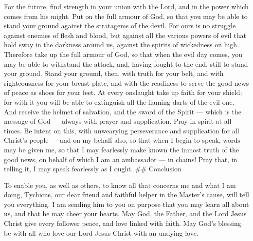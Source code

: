  For the future, find strength in your union with the Lord,
and in the power which comes from his might.  Put on the
full armour of God, so that you may be able to stand your ground against
the stratagems of the devil.  For ours is no struggle
against enemies of flesh and blood, but against all the various powers
of evil that hold sway in the darkness around us, against the spirits of
wickedness on high.  Therefore take up the full armour of
God, so that when the evil day comes, you may be able to withstand the
attack, and, having fought to the end, still to stand your ground.
 Stand your ground, then, with truth for your belt, and
with righteousness for your breast-plate,  and with the
readiness to serve the good news of peace as shoes for your feet.
 At every onslaught take up faith for your shield; for with
it you will be able to extinguish all the flaming darts of the evil one.
 And receive the helmet of salvation, and the sword of the
Spirit --- which is the message of God --- always with prayer and
supplication.  Pray in spirit at all times. Be intent on
this, with unwearying perseverance and supplication for all Christ's
people ---  and on my behalf also, so that when I begin to
speak, words may be given me, so that I may fearlessly make known the
inmost truth of the good news,  on behalf of which I am an
ambassador --- in chains! Pray that, in telling it, I may speak
fearlessly as I ought. \#\# Conclusion

 To enable you, as well as others, to know all that
concerns me and what I am doing, Tychicus, our dear friend and faithful
helper in the Master's cause, will tell you everything.  I
am sending him to you on purpose that you may learn all about us, and
that he may cheer your hearts.  May God, the Father, and
the Lord Jesus Christ give every follower peace, and love linked with
faith.  May God's blessing be with all who love our Lord
Jesus Christ with an undying love.
